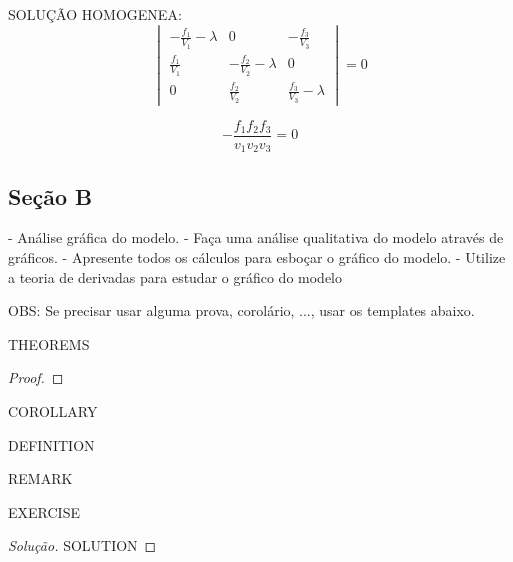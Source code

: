 SOLUÇÃO HOMOGENEA:
\begin{equation}
\renewcommand{\arraystretch}{1.8}
    \begin{vmatrix}
        -\frac{f_1}{V_1}-\lambda & 0 & -\frac{f_3}{V_3}\\
        \frac{f_1}{V_1} & -\frac{f_2}{V_2}-\lambda & 0\\
        0 & \frac{f_2}{V_2} & \frac{f_3}{V_3}-\lambda
    \end{vmatrix}
    =0
\end{equation}

\begin{equation}
    [(\frac{f_1}{v_1}+\lambda)\cdot(\frac{f_2}{v_2}
    +\lambda)\cdot(\frac{f_3}{v_3}+\lambda)]-\frac{f_1f_2f_3}{v_1v_2v_3}=0
\end{equation}


\subsection{Seção B}

- Análise gráfica do modelo.
- Faça uma análise qualitativa do modelo através de gráficos. 
- Apresente todos os cálculos para esboçar o gráfico do modelo. 
- Utilize a teoria de derivadas para estudar o gráfico do modelo


OBS: Se precisar usar alguma prova, corolário, ..., usar os templates abaixo.

\begin{theorem}
THEOREMS
\end{theorem}
\begin{proof}
\end{proof}
\begin{corollary}
COROLLARY
\end{corollary}
\begin{definition}
DEFINITION
\end{definition}
\begin{remark}
REMARK
\end{remark}
\begin{exercise}
EXERCISE
\end{exercise}
\begin{proof}[Solução]
SOLUTION
\end{proof}
\clearpage
